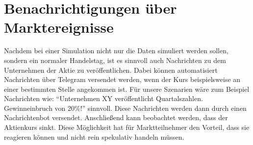 \section{Benachrichtigungen über Marktereignisse}
Nachdem bei einer Simulation nicht nur die Daten simuliert werden sollen, sondern ein normaler Handelstag, ist es sinnvoll auch Nachrichten 
zu dem Unternehmen der Aktie zu veröffentlichen. Dabei können automatisiert Nachrichten über Telegram versendet werden, wenn der Kurs beispielsweise 
an einer bestimmten Stelle angekommen ist. Für unsere Szenarien wäre zum Beispiel Nachrichten wie: \enquote{Unternehmen XY veröffentlicht Quartalszahlen. 
Gewinneinbruch von 20\%!} sinnvoll. Diese Nachrichten werden dann durch einen Nachrichtenbot versendet.
Anschließend kann beobachtet werden, dass der Aktienkurs sinkt. Diese Möglichkeit hat für Marktteilnehmer den Vorteil, dass sie reagieren können und nicht 
rein spekulativ handeln müssen.
